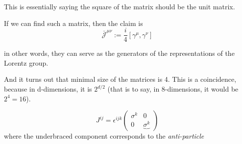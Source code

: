 \documentclass[11pt]{article}
\begin{document}
This is essentially saying the square of the matrix should be the unit matrix.

If we can find such a matrix, then the claim is \[ \bar{\mathcal{J}}^{\mu\nu} := \frac{i}{4} [\gamma^\mu, \gamma^\nu]\]

in other words, they can serve as the generators of the representations of the Lorentz group.


And it turns out that minimal size of the matrices is 4. This is a coincidence, because in d-dimensions, it is $2^{d/2}$ (that is to say, in 8-dimensions, it would be $2^4 = 16$).


\[ J^{ij} = \epsilon^{ijk} \begin{pmatrix}
	\sigma^k & 0 \\ 0 & \underbrace{\sigma^k}
\end{pmatrix} \]
where the underbraced component corresponds to the \textit{anti-particle}
\end{document}
